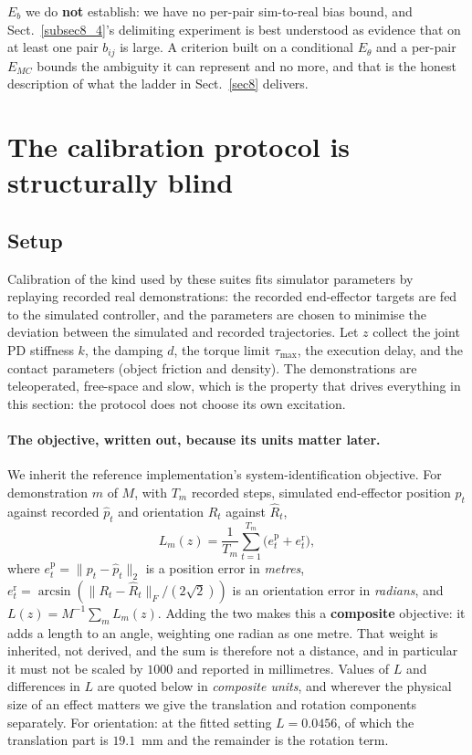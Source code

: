 \documentclass[pdflatex,iicol,sn-apa]{sn-jnl}
\theoremstyle{remark}
\begin{document}
$E_b$ we do \textbf{not} establish: we have no per-pair sim-to-real bias bound, and
Sect.~\ref{subsec8_4}'s delimiting experiment is best understood as evidence that on at least one
pair $b_{ij}$ is large. A criterion built on a conditional $E_\theta$ and a per-pair $E_{MC}$ bounds
the ambiguity it can represent and no more, and that is the honest description of what the ladder in
Sect.~\ref{sec8} delivers.

\section{The calibration protocol is structurally blind}\label{sec4}

\subsection{Setup}\label{subsec4_1}

Calibration of the kind used by these suites fits simulator parameters by replaying recorded real
demonstrations: the recorded end-effector targets are fed to the simulated controller, and the
parameters are chosen to minimise the deviation between the simulated and recorded trajectories. Let
$z$ collect the joint PD stiffness $k$, the damping $d$, the torque limit $\tau_{\max}$, the
execution delay, and the contact parameters (object friction and density). The demonstrations are
teleoperated, free-space and slow, which is the property that drives everything in this section: the
protocol does not choose its own excitation.

\paragraph{The objective, written out, because its units matter later.}
We inherit the reference implementation's system-identification objective. For demonstration $m$ of
$M$, with $T_m$ recorded steps, simulated end-effector position $p_t$ against recorded $\hat p_t$
and orientation $R_t$ against $\hat R_t$,
\begin{equation}\label{eq:loss}
L_m(z) = \frac{1}{T_m} \sum_{t=1}^{T_m} \big( e^{\mathrm{p}}_t + e^{\mathrm{r}}_t \big),
\end{equation}
where $e^{\mathrm{p}}_t = \lVert p_t - \hat p_t \rVert_2$ is a position error in \emph{metres},
$e^{\mathrm{r}}_t = \arcsin(\lVert R_t - \hat R_t\rVert_F/(2\sqrt2))$ is an orientation error in
\emph{radians}, and $L(z) = M^{-1}\sum_m L_m(z)$. Adding the two makes this a \textbf{composite}
objective: it adds a length to an
angle, weighting one radian as one metre. That weight is inherited, not derived, and the sum is
therefore not a distance, and in particular it must not be scaled by $1000$ and reported in
millimetres. Values of
$L$ and differences in $L$ are quoted below in \emph{composite units}, and wherever the physical size
of an effect matters we give the translation and rotation components separately. For orientation:
at the fitted setting $L = 0.0456$, of which the translation part is $19.1$~mm and the remainder is
the rotation term.
\end{document}

